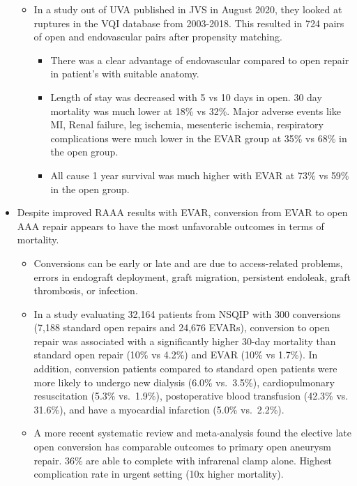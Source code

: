 \documentclass[
]{book}
\begin{document}
\begin{itemize}
  \begin{itemize}
  \item
    In a study out of UVA published in JVS in August 2020, they
    looked at ruptures in the VQI database from 2003-2018. This
    resulted in 724 pairs of open and endovascular pairs after
    propensity matching. \citep{wangEndovascularRepairRuptured2020a}

    \begin{itemize}
    \item
      There was a clear advantage of endovascular compared to open
      repair in patient's with suitable anatomy.
    \item
      Length of stay was decreased with 5 vs 10 days in open. 30
      day mortality was much lower at 18\% vs 32\%. Major adverse
      events like MI, Renal failure, leg ischemia, mesenteric
      ischemia, respiratory complications were much lower in the
      EVAR group at 35\% vs 68\% in the open group.
    \item
      All cause 1 year survival was much higher with EVAR at 73\%
      vs 59\% in the open group.
    \end{itemize}
  \end{itemize}
\item
  Despite improved RAAA results with EVAR, conversion from EVAR to
  open AAA repair appears to have the most unfavorable outcomes in
  terms of mortality.

  \begin{itemize}
  \item
    Conversions can be early or late and are due to access-related
    problems, errors in endograft deployment, graft migration,
    persistent endoleak, graft thrombosis, or infection.
  \item
    In a study evaluating 32,164 patients from NSQIP with 300
    conversions (7,188 standard open repairs and 24,676 EVARs),
    conversion to open repair was associated with a significantly
    higher 30-day mortality than standard open repair (10\% vs 4.2\%)
    and EVAR (10\% vs 1.7\%). In addition, conversion patients
    compared to standard open patients were more likely to undergo
    new dialysis (6.0\% vs.~3.5\%), cardiopulmonary resuscitation
    (5.3\% vs.~1.9\%), postoperative blood transfusion (42.3\% vs.
    31.6\%), and have a myocardial infarction (5.0\% vs.~2.2\%).
    \citep{ulteeConversionEVAROpen2016}
  \item
    A more recent systematic review and meta-analysis found the
    elective late open conversion has comparable outcomes to primary
    open aneurysm repair. 36\% are able to complete with infrarenal
    clamp alone. Highest complication rate in urgent setting (10x
    higher mortality).
    \citep{goudekettingSystematicReviewMetaanalysis2019}
  \end{itemize}
\end{itemize}
\end{document}
